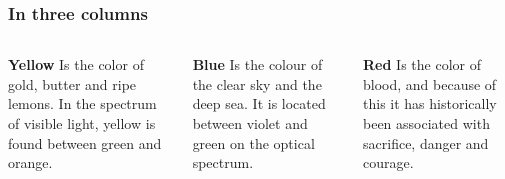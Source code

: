 \documentclass[aspectratio=169]{beamer}
\begin{document}
\begin{frame}
\frametitle{In three columns}
\begin{columns}[T]
    \begin{column}{0.3\textwidth}
    \textbf{Yellow}
    \small
    Is the color of gold, butter and ripe lemons. In the spectrum of visible light, yellow is found between green and orange.
    \end{column}
    
    \begin{column}{0.3\textwidth}
    \textbf{Blue}
    \small
    Is the colour of the clear sky and the deep sea. It is located between violet and green on the optical spectrum.
    \end{column}
    
    \begin{column}{0.3\textwidth}
    \textbf{Red}
    \small
    Is the color of blood, and because of this it has historically been associated with sacrifice, danger and courage.
    \end{column}
\end{columns}
\end{frame}

\begin{frame}[plain]
\begin{center}
\end{center}
\end{frame}
\end{document}
